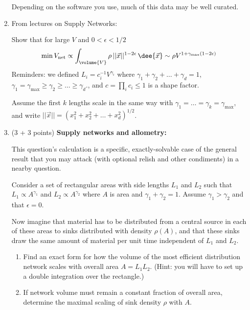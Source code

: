 \begin{enumerate}
  Depending on the software you use, much of this data may be well curated.

  
   \solutionstart


   \solutionend

\item
  From lectures on Supply Networks:

  Show that for large $V$ and $0 < \epsilon < 1/2$
  $$
  {\min V_{\rm net}}  \propto 
  \int_{\volume{V}} {\rho} \, ||\vec{x}||^{1-2\epsilon} \, \dee{\vec{x}}
  \sim \rho V^{1+\gamma_{\max}(1-2\epsilon)}
  $$
  Reminders: we defined 
  $
  {L_i} = c_i^{-1} V^{\gamma_i}
  $
  where 
  $
  \gamma_1 + \gamma_2 + \ldots + \gamma_d = 1
  $,
  $
  \gamma_1 = \gamma_{\max} \ge \gamma_2 \ge \ldots \ge \gamma_d.
  $,
  and $c = \prod_i c_i \le 1$ is a shape factor.

  Assume the first $k$ lengths scale
  in the same way with $\gamma_1 = \ldots = \gamma_k = \gamma_{\max}$,
  and write $||\vec{x}|| = (x_1^2 + x_2^2 + \ldots + x_d^2)^{1/2}$.

  
   \solutionstart


   \solutionend
  
\item (3 + 3 points)
  \textbf{Supply networks and allometry:}

  This question's calculation is a specific, exactly-solvable case
  of the general result that you may attack
  (with optional relish
  and other condiments)
  in a nearby question.

  Consider a set of rectangular areas with side lengths
  $L_{1}$ and $L_{2}$ such that $L_{1} \propto A^{\gamma_{1}}$ and
  $L_{2} \propto A^{\gamma_{2}}$ where $A$ is area and $\gamma_{1} + \gamma_{2}=1$.  
  Assume $\gamma_{1} > \gamma_{2}$ and that $\epsilon=0$.

  Now imagine that material has to be distributed from a central
  source in each of these areas to sinks distributed with
  density $\rho(A)$, and that these sinks draw the same amount
  of material per unit time independent of $L_{1}$ and $L_{2}$.

  \begin{enumerate}
  \item 
    Find an exact form for how the volume of the most efficient distribution
    network scales with overall area $A = L_{1} L_{2}$.  (Hint: you will
    have to set up a double integration over the rectangle.)
  \item 
    If network volume must remain a constant fraction of overall
    area, determine the maximal scaling of sink density $\rho$ with $A$.
  \end{enumerate}


\end{enumerate}
